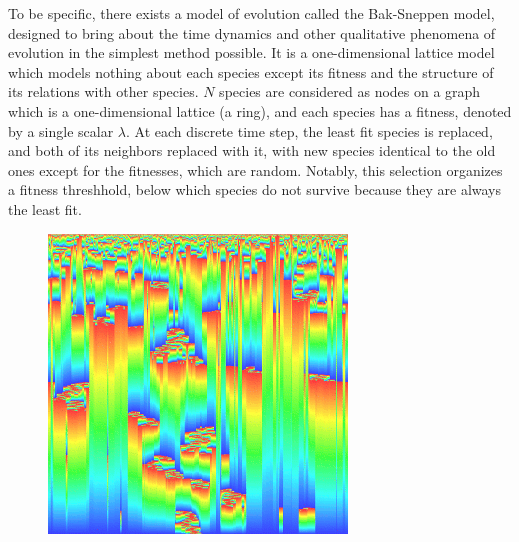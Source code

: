 \documentclass[12pt]{article}
\begin{document}
To be specific, there exists a model of evolution called the Bak-Sneppen model, designed to bring about the time dynamics and other qualitative phenomena of evolution in the simplest method possible. It is a one-dimensional lattice model which models nothing about each species except its fitness and the structure of its relations with other species. $N$ species are considered as nodes on a graph which is a one-dimensional lattice (a ring), and each species has a fitness, denoted by a single scalar $\lambda$. At each discrete time step, the least fit species is replaced, and both of its neighbors replaced with it, with new species identical to the old ones except for the fitnesses, which are random. Notably, this selection organizes a fitness threshhold, below which species do not survive because they are always the least fit.

\begin{figure}
  \includegraphics{bak_sneppen}
\end{figure}
\end{document}

